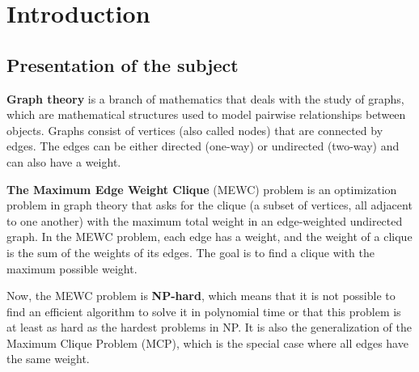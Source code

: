 
\section{Introduction}

\subsection{Presentation of the subject}

\textbf{Graph theory} is a branch of mathematics that deals with the study of graphs,
which are mathematical structures used to model pairwise relationships between
objects. Graphs consist of vertices (also called nodes) that are connected by
edges. The edges can be either directed (one-way) or undirected (two-way) and can
also have a weight. \newline

\textbf{The Maximum Edge Weight Clique} (MEWC) problem is an optimization problem
in graph theory that asks for the clique (a subset of vertices, all adjacent to
one another) with the maximum total weight in an edge-weighted undirected graph.
In the MEWC problem, each edge has a weight, and the weight of a clique is the
sum of the weights of its edges. The goal is to find a clique with the maximum
possible weight. \newline

Now, the MEWC problem is \textbf{NP-hard}, which means that it is not possible
to find an efficient algorithm to solve it in polynomial time or that this problem
is at least as hard as the hardest problems in NP. It is also the generalization
of the Maximum Clique Problem (MCP), which is the special case where all edges
have the same weight. \newline

